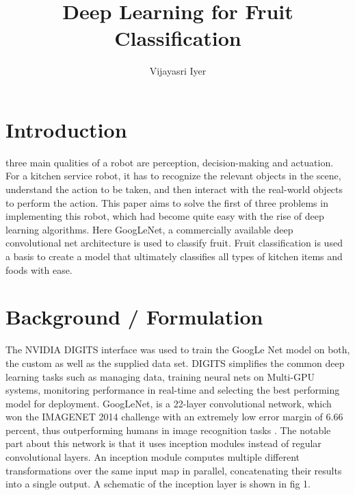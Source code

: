 \documentclass[10pt,journal,compsoc]{IEEEtran}
\begin{document}
\title{Deep Learning for Fruit Classification}

\author{Vijayasri Iyer}

%
{}


\maketitle
\IEEEdisplaynontitleabstractindextext
\IEEEpeerreviewmaketitle
\section{Introduction}
\label{sec:introduction}

 three main qualities of a robot are perception, decision-making and actuation. For a kitchen service robot, it has to recognize the relevant objects in the scene, understand the action to be taken, and then interact with the real-world objects to perform the action. This paper aims to solve the first of three problems in implementing this robot, which had become quite easy with the rise of deep learning algorithms. Here GoogLeNet, a commercially available deep convolutional net architecture is used to classify fruit. Fruit classification is used a basis to create a model that ultimately classifies all types of kitchen items and foods with ease.

\section{Background / Formulation}
The NVIDIA DIGITS interface was used to train the GoogLe Net model on both, the custom as well as the supplied data set. DIGITS simplifies the common deep learning tasks such as managing data, training neural nets on Multi-GPU systems, monitoring performance in real-time and selecting the best performing model for deployment. GoogLeNet, is a 22-layer convolutional network, which won the IMAGENET 2014 challenge with an extremely low error margin of 6.66 percent, thus outperforming humans in image recognition tasks \cite{googlenet}. The notable part about this network is that it uses inception modules instead of regular convolutional layers. An inception module computes multiple different transformations over the same input map in parallel, concatenating their results into a single output. A schematic of the inception layer is shown in fig 1. 
\end{document}
